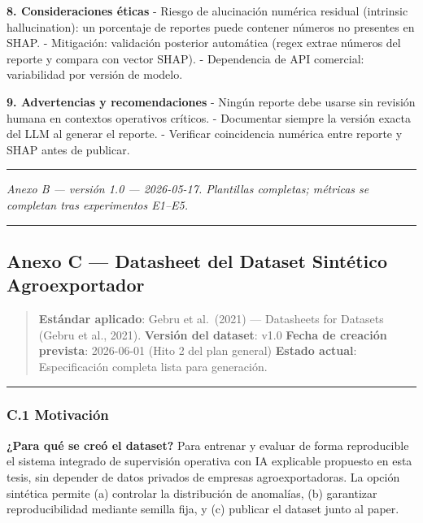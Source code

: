 \textbf{8. Consideraciones éticas} - Riesgo de alucinación numérica
residual (intrinsic hallucination): un porcentaje de reportes puede
contener números no presentes en SHAP. - Mitigación: validación
posterior automática (regex extrae números del reporte y compara con
vector SHAP). - Dependencia de API comercial: variabilidad por versión
de modelo.

\textbf{9. Advertencias y recomendaciones} - Ningún reporte debe usarse
sin revisión humana en contextos operativos críticos. - Documentar
siempre la versión exacta del LLM al generar el reporte. - Verificar
coincidencia numérica entre reporte y SHAP antes de publicar.

\begin{center}\rule{0.5\linewidth}{0.5pt}\end{center}

\emph{Anexo B --- versión 1.0 --- 2026-05-17. Plantillas completas;
métricas se completan tras experimentos E1--E5.}

\begin{center}\rule{0.5\linewidth}{0.5pt}\end{center}

\subsection{Anexo C --- Datasheet del Dataset Sintético
Agroexportador}\label{anexo-c-datasheet-del-dataset-sintuxe9tico-agroexportador}

\begin{quote}
\textbf{Estándar aplicado}: Gebru et al.~(2021) --- Datasheets for
Datasets (Gebru et al., 2021). \textbf{Versión del dataset}: v1.0
\textbf{Fecha de creación prevista}: 2026-06-01 (Hito 2 del plan
general) \textbf{Estado actual}: 📐 Especificación completa lista para
generación.
\end{quote}

\begin{center}\rule{0.5\linewidth}{0.5pt}\end{center}

\subsubsection{C.1 Motivación}\label{c.1-motivaciuxf3n}

\textbf{¿Para qué se creó el dataset?} Para entrenar y evaluar de forma
reproducible el sistema integrado de supervisión operativa con IA
explicable propuesto en esta tesis, sin depender de datos privados de
empresas agroexportadoras. La opción sintética permite (a) controlar la
distribución de anomalías, (b) garantizar reproducibilidad mediante
semilla fija, y (c) publicar el dataset junto al paper.

